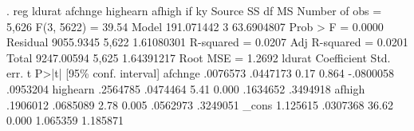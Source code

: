 . reg ldurat afchnge highearn afhigh if ky
{\smallskip}
      Source {\VBAR}       SS           df       MS      Number of obs   =     5,626
   F(3, 5622)      =     39.54
       Model {\VBAR}  191.071442         3  63.6904807   Prob > F        =    0.0000
    Residual {\VBAR}   9055.9345     5,622  1.61080301   R-squared       =    0.0207
   Adj R-squared   =    0.0201
       Total {\VBAR}  9247.00594     5,625  1.64391217   Root MSE        =    1.2692
{\smallskip}
      ldurat {\VBAR} Coefficient  Std. err.      t    P>|t|     [95\% conf. interval]
     afchnge {\VBAR}   .0076573   .0447173     0.17   0.864    -.0800058    .0953204
    highearn {\VBAR}   .2564785   .0474464     5.41   0.000     .1634652    .3494918
      afhigh {\VBAR}   .1906012   .0685089     2.78   0.005     .0562973    .3249051
       _cons {\VBAR}   1.125615   .0307368    36.62   0.000     1.065359    1.185871
{\smallskip}
